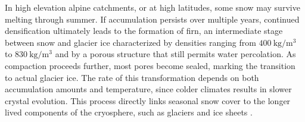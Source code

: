 In high elevation alpine catchments, or at high latitudes, some snow may survive melting through summer. If accumulation persists over multiple years, 
continued densification ultimately leads to the formation of firn, an intermediate stage between snow and glacier ice characterized by densities ranging 
from $\SI{400}{\kilo\gram\per\meter\cubed}$ to $\SI{830}{\kilo\gram\per\meter\cubed}$ and by a porous structure that still permits water percolation. 
As compaction proceeds further, most pores become sealed, marking the transition to actual glacier ice. The rate of this transformation depends on 
both accumulation amounts and temperature, since colder climates results in slower crystal evolution. This process directly links seasonal snow cover 
to the longer lived components of the cryosphere, such as glaciers and ice sheets \parencite{snow_to_ice}. 










